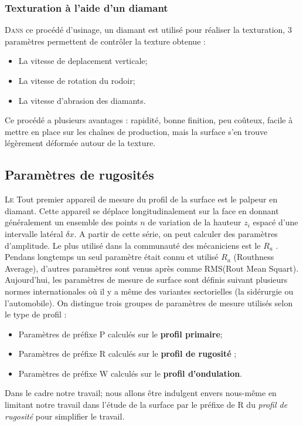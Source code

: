 \subsubsection{Texturation à l'aide d'un diamant}
\lettrine{D}{ans} ce procédé d’usinage, un diamant est utilisé pour réaliser la texturation, 3 paramètres permettent de contrôler la texture obtenue :
\begin{itemize}	
	\item La vitesse de deplacement verticale;
	\item La vitesse de rotation du rodoir;
	\item La vitesse d'abrasion des diamants.
\end{itemize}
Ce procédé a plusieurs avantages : rapidité, bonne finition, peu coûteux, facile à mettre en place sur les chaînes de production, mais la surface s’en trouve légèrement déformée autour de la texture.

\subsection{Paramètres de rugosités}
\lettrine{L}{e} Tout premier appareil de mesure du profil de la surface est le palpeur en diamant. Cette appareil se déplace longitudinalement sur la face en donnant généralement un ensemble des points $n$ de variation de la hauteur $z_i$ espacé d'une intervalle latéral $\delta x$. A partir de cette série, on peut calculer des paramètres d’amplitude. Le plus utilisé dans la communauté des mécaniciens est le $R_a$ \cite{initiation}. Pendans longtemps un seul paramètre était connu et utilisé $R_a$ (Routhness Average), d'autres paramètres sont venus après comme RMS(Rout Mean Squart). Aujourd'hui, les paramètres de mesure de surface sont définis suivant plusieurs normes internationales où il y a même des variantes sectorielles (la sidérurgie ou l'automobile). On distingue trois groupes de paramètres de mesure utilisés selon le type de profil \cite{ayad1}:
\begin{itemize}
	\item Paramètres de préfixe P calculés sur le \textbf{profil primaire};
	\item Paramètres de préfixe R calculés sur le \textbf{profil de rugosité} ;
	\item Paramètres de préfixe W calculés sur le \textbf{profil d'ondulation}.
\end{itemize}
Dans le cadre notre travail; nous allons être indulgent envers nous-même en limitant notre travail dans l'étude de la surface  par le préfixe de R du \emph{profil de rugosité} pour simplifier le travail.\\

